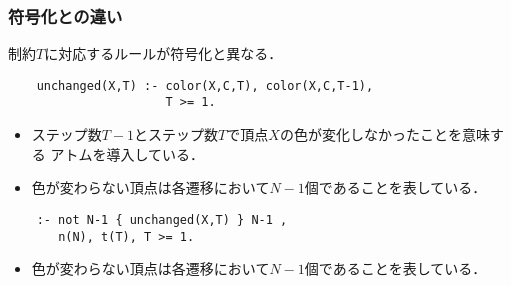 \begin{frame}[fragile]\frametitle{符号化との違い}

  制約$T$に対応するルールが符号化と異なる．

  \begin{exampleblock}{}
    \centering
    \begin{lstlisting}
    unchanged(X,T) :- color(X,C,T), color(X,C,T-1), 
                      T >= 1.
    \end{lstlisting}
  \end{exampleblock}
  \begin{itemize}
    \item ステップ数$T-1$とステップ数$T$で頂点$X$の色が変化しなかったことを意味する
          アトムを導入している．
    \item 色が変わらない頂点は各遷移において$N-1$個であることを表している．
  \end{itemize}

  \begin{exampleblock}{}
    \centering
    \begin{lstlisting}
    :- not N-1 { unchanged(X,T) } N-1 , 
       n(N), t(T), T >= 1.
    \end{lstlisting}
  \end{exampleblock}
  \begin{itemize}
    \item 色が変わらない頂点は各遷移において$N-1$個であることを表している．
  \end{itemize}
  
\end{frame}

